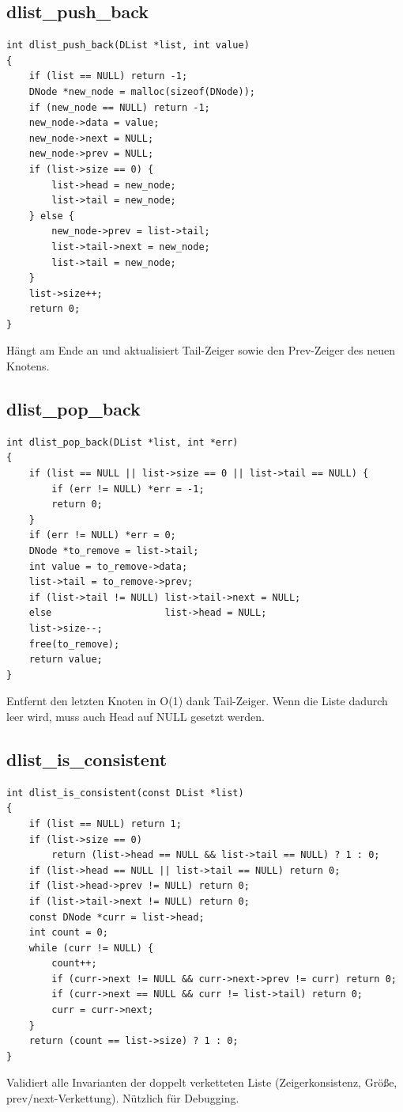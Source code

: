 \documentclass[10pt, a4paper]{article}
\begin{document}
\subsection{dlist\_push\_back}
\begin{lstlisting}
int dlist_push_back(DList *list, int value)
{
    if (list == NULL) return -1;
    DNode *new_node = malloc(sizeof(DNode));
    if (new_node == NULL) return -1;
    new_node->data = value;
    new_node->next = NULL;
    new_node->prev = NULL;
    if (list->size == 0) {
        list->head = new_node;
        list->tail = new_node;
    } else {
        new_node->prev = list->tail;
        list->tail->next = new_node;
        list->tail = new_node;
    }
    list->size++;
    return 0;
}
\end{lstlisting}
H\"angt am Ende an und aktualisiert Tail-Zeiger sowie den Prev-Zeiger des neuen Knotens.

\subsection{dlist\_pop\_back}
\begin{lstlisting}
int dlist_pop_back(DList *list, int *err)
{
    if (list == NULL || list->size == 0 || list->tail == NULL) {
        if (err != NULL) *err = -1;
        return 0;
    }
    if (err != NULL) *err = 0;
    DNode *to_remove = list->tail;
    int value = to_remove->data;
    list->tail = to_remove->prev;
    if (list->tail != NULL) list->tail->next = NULL;
    else                    list->head = NULL;
    list->size--;
    free(to_remove);
    return value;
}
\end{lstlisting}
Entfernt den letzten Knoten in O(1) dank Tail-Zeiger. Wenn die Liste dadurch leer wird, muss auch Head auf NULL gesetzt werden.

\subsection{dlist\_is\_consistent}
\begin{lstlisting}
int dlist_is_consistent(const DList *list)
{
    if (list == NULL) return 1;
    if (list->size == 0)
        return (list->head == NULL && list->tail == NULL) ? 1 : 0;
    if (list->head == NULL || list->tail == NULL) return 0;
    if (list->head->prev != NULL) return 0;
    if (list->tail->next != NULL) return 0;
    const DNode *curr = list->head;
    int count = 0;
    while (curr != NULL) {
        count++;
        if (curr->next != NULL && curr->next->prev != curr) return 0;
        if (curr->next == NULL && curr != list->tail) return 0;
        curr = curr->next;
    }
    return (count == list->size) ? 1 : 0;
}
\end{lstlisting}
Validiert alle Invarianten der doppelt verketteten Liste (Zeigerkonsistenz, Gr\"o\ss e, prev/next-Verkettung). N\"utzlich f\"ur Debugging.
\end{document}
